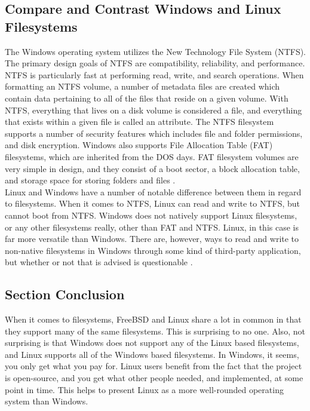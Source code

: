 \documentclass[onecolumn, draftclsnofoot,10pt, compsoc]{IEEEtran}
\begin{document}
\subsection{Compare and Contrast Windows and Linux Filesystems}
\noindent The Windows operating system utilizes the New Technology File System (NTFS). The primary design goals of NTFS are compatibility, reliability, and performance. NTFS is particularly fast at performing read, write, and search operations. When formatting an NTFS volume, a number of metadata files are created which contain data pertaining to all of the files that reside on a given volume. With NTFS, everything that lives on a disk volume is considered a file, and everything that exists within a given file is called an attribute. The NTFS filesystem supports a number of security features which includes file and folder permissions, and disk encryption. Windows also supports File Allocation Table (FAT) filesystems, which are inherited from the DOS days. FAT filesystem volumes are very simple in design, and they consist of a boot sector, a block allocation table, and storage space for storing folders and files \cite{MSWindows1FS} \cite{MSWindows2FS}.\\

\noindent Linux and Windows have a number of notable difference between them in regard to filesystems. When it comes to NTFS, Linux can read and write to NTFS, but cannot boot from NTFS. Windows does not natively support Linux filesystems, or any other filesystems really, other than FAT and NTFS. Linux, in this case is far more versatile than Windows. There are, however, ways to read and write to non-native filesystems in Windows through some kind of third-party application, but whether or not that is advised is questionable \cite{Linux1FS} \cite{Linux2FS}.\\

\subsection{Section Conclusion}
\noindent When it comes to filesystems, FreeBSD and Linux share a lot in common in that they support many of the same filesystems. This is surprising to no one. Also, not surprising is that Windows does not support any of the Linux based filesystems, and Linux supports all of the Windows based filesystems. In Windows, it seems, you only get what you pay for. Linux users benefit from the fact that the project is open-source, and you get what other people needed, and implemented, at some point in time. This helps to present Linux as a more well-rounded operating system than Windows.
\end{document}
